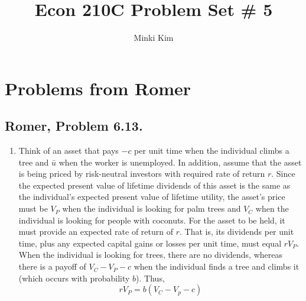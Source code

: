 \documentclass[11pt]{amsart}
\title{Econ 210C Problem Set \# 5}
\author{Minki Kim}
\begin{document}
\maketitle

\section{Problems from Romer}
\subsection{Romer, Problem 6.13.}
\begin{enumerate}[label = (\alph*)]
	\item Think of an asset that pays $-c$ per unit time when the individual climbs a tree and $\bar{u}$ when the worker is unemployed. 
	In addition, assume that the asset is being priced by risk-neutral investors with required rate of return $r$. 
	Since the expected present value of lifetime dividends of this asset is the same as the individual's expected present value of lifetime utility, the asset's price must be $V_P$ when the individual is looking for palm trees and $V_C$ when the individual is looking for people with coconuts. 
	For the asset to be held, it must provide an expected rate of return of $r$. 
	That is, its dividends per unit time, plus any expected capital gains or losses per unit time, must equal $rV_P$.
	When the individual is looking for trees, there are no dividends, whereas there is a payoff of $V_C - V_P - c$ when the individual finds a tree and climbs it (which occurs with probability $b$). 
	Thus,
	\[
	r V_P = b(V_C - V_p - c)
	\]


\end{enumerate}
\end{document}
